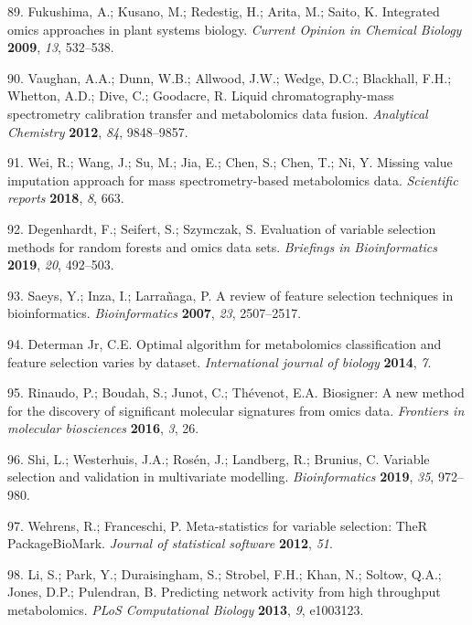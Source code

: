 \documentclass[]{article}
\begin{document}
\leavevmode\hypertarget{ref-fukushima_2009}{}%
89. Fukushima, A.; Kusano, M.; Redestig, H.; Arita, M.; Saito, K. Integrated omics approaches in plant systems biology. \emph{Current Opinion in Chemical Biology} \textbf{2009}, \emph{13}, 532--538.

\leavevmode\hypertarget{ref-vaughan_2012}{}%
90. Vaughan, A.A.; Dunn, W.B.; Allwood, J.W.; Wedge, D.C.; Blackhall, F.H.; Whetton, A.D.; Dive, C.; Goodacre, R. Liquid chromatography-mass spectrometry calibration transfer and metabolomics data fusion. \emph{Analytical Chemistry} \textbf{2012}, \emph{84}, 9848--9857.

\leavevmode\hypertarget{ref-wei_2018}{}%
91. Wei, R.; Wang, J.; Su, M.; Jia, E.; Chen, S.; Chen, T.; Ni, Y. Missing value imputation approach for mass spectrometry-based metabolomics data. \emph{Scientific reports} \textbf{2018}, \emph{8}, 663.

\leavevmode\hypertarget{ref-degenhardt_2019}{}%
92. Degenhardt, F.; Seifert, S.; Szymczak, S. Evaluation of variable selection methods for random forests and omics data sets. \emph{Briefings in Bioinformatics} \textbf{2019}, \emph{20}, 492--503.

\leavevmode\hypertarget{ref-saeys_2007}{}%
93. Saeys, Y.; Inza, I.; Larrañaga, P. A review of feature selection techniques in bioinformatics. \emph{Bioinformatics} \textbf{2007}, \emph{23}, 2507--2517.

\leavevmode\hypertarget{ref-determanjr_2014}{}%
94. Determan Jr, C.E. Optimal algorithm for metabolomics classification and feature selection varies by dataset. \emph{International journal of biology} \textbf{2014}, \emph{7}.

\leavevmode\hypertarget{ref-rinaudo_2016}{}%
95. Rinaudo, P.; Boudah, S.; Junot, C.; Thévenot, E.A. Biosigner: A new method for the discovery of significant molecular signatures from omics data. \emph{Frontiers in molecular biosciences} \textbf{2016}, \emph{3}, 26.

\leavevmode\hypertarget{ref-shi_2019}{}%
96. Shi, L.; Westerhuis, J.A.; Rosén, J.; Landberg, R.; Brunius, C. Variable selection and validation in multivariate modelling. \emph{Bioinformatics} \textbf{2019}, \emph{35}, 972--980.

\leavevmode\hypertarget{ref-wehrens_2012}{}%
97. Wehrens, R.; Franceschi, P. Meta-statistics for variable selection: TheR PackageBioMark. \emph{Journal of statistical software} \textbf{2012}, \emph{51}.

\leavevmode\hypertarget{ref-li_2013}{}%
98. Li, S.; Park, Y.; Duraisingham, S.; Strobel, F.H.; Khan, N.; Soltow, Q.A.; Jones, D.P.; Pulendran, B. Predicting network activity from high throughput metabolomics. \emph{PLoS Computational Biology} \textbf{2013}, \emph{9}, e1003123.
\end{document}
